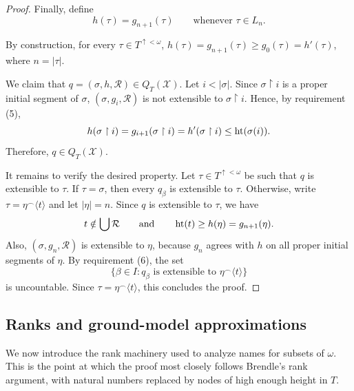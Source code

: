 \begin{proof}
Finally, define
\[
  h(\tau)=g_{n+1}(\tau)
  \qquad\text{whenever }\tau\in L_n.
\]

By construction, for every $\tau\in T^{\uparrow<\omega}$, $h(\tau)=g_{n+1}(\tau)\geq g_0(\tau)=h'(\tau)$, where $n=|\tau|$.

We claim that $q=(\sigma,h,\mathcal R)\in Q_T(\mathcal X)$.
Let $i<|\sigma|$.
Since $\sigma\restriction i$ is a proper initial segment of $\sigma$,
$(\sigma,g_i,\mathcal R)$ is not extensible to $\sigma\restriction i$.
Hence, by requirement (5),
\[
  h(\sigma\restriction i)=g_{i+1}(\sigma\restriction i)
  =h'(\sigma\restriction i)
  \leq \operatorname{ht}(\sigma(i)).
\]
Therefore, $q\in Q_T(\mathcal X)$.

It remains to verify the desired property.  Let $\tau\in T^{\uparrow<\omega}$
be such that $q$ is extensible to $\tau$.  If $\tau=\sigma$, then every
$q_\beta$ is extensible to $\tau$.  Otherwise, write
$\tau=\eta^\frown\langle t\rangle$ and let $|\eta|=n$.  Since $q$ is
extensible to $\tau$, we have
\[
  t\notin\bigcup\mathcal R
  \qquad\text{and}\qquad
  \operatorname{ht}(t)\geq h(\eta)=g_{n+1}(\eta).
\]
Also, $(\sigma,g_n,\mathcal R)$ is extensible to $\eta$, because $g_n$ agrees
with $h$ on all proper initial segments of $\eta$.  By requirement (6), the
set
\[
  \{\beta\in I:q_\beta\text{ is extensible to }
      \eta^\frown\langle t\rangle\}
\]
is uncountable.  Since $\tau=\eta^\frown\langle t\rangle$, this concludes the
proof.
\end{proof}

\subsection{Ranks and ground-model approximations}
\label{subsec:ranks}

We now introduce the rank machinery used to analyze names for subsets of $\omega$.
This is the point at which the proof most closely follows Brendle's rank argument,
with natural numbers replaced by nodes of high enough height in $T$.

